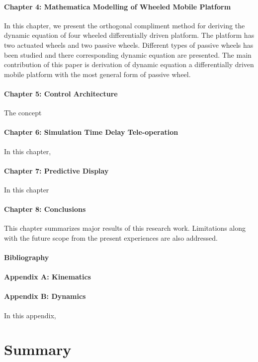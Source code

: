 \paragraph*{Chapter 4: Mathematica Modelling of Wheeled Mobile Platform \\}
In this chapter, we present the orthogonal compliment method for deriving the dynamic equation of four wheeled differentially driven platform. The platform has two actuated wheels and two passive wheels. Different types of passive wheels has been studied and there corresponding dynamic equation are presented. The main contribution of this paper is derivation of dynamic equation a differentially driven  mobile platform with the most general form of passive wheel.
\paragraph*{Chapter 5: Control Architecture\\}
The concept 
\paragraph*{Chapter 6: Simulation Time Delay Tele-operation \\}
In this chapter, 
\paragraph*{Chapter 7: Predictive Display \\}
In this chapter

\paragraph*{Chapter 8: Conclusions\\}
This chapter summarizes major results of this research work. Limitations along with the future scope from the present experiences are also addressed.


\paragraph*{Bibliography}
\paragraph*{Appendix A:  Kinematics  \\}

\paragraph*{Appendix B:  Dynamics  \\}
In this appendix, 
\section{Summary}

